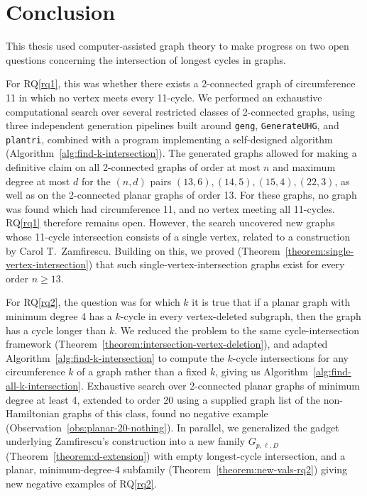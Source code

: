 \chapter{Conclusion}
\label{cha:conclusion}

This thesis used computer-assisted graph theory to make progress on two open questions concerning the intersection of longest cycles in graphs.

For RQ\ref{rq1}, this was whether there exists a 2-connected graph of circumference 11 in which no vertex meets every 11-cycle. We performed an exhaustive computational search over several restricted classes of 2-connected graphs, using three independent generation pipelines built around \texttt{geng}, \texttt{GenerateUHG}, and \texttt{plantri}, combined with a program implementing a self-designed algorithm (Algorithm~\ref{alg:find-k-intersection}). The generated graphs allowed for making a definitive claim on all 2-connected graphs of order at most $n$ and maximum degree at most $d$ for the $(n,d)$ pairs $(13,6),(14,5),(15,4),(22,3)$, as well as on the 2-connected planar graphs of order 13. For these graphs, no graph was found which had circumference 11, and no vertex meeting all 11-cycles. RQ\ref{rq1} therefore remains open. However, the search uncovered new graphs whose 11-cycle intersection consists of a single vertex, related to a construction by Carol T.\ Zamfirescu. Building on this, we proved (Theorem~\ref{theorem:single-vertex-intersection}) that such single-vertex-intersection graphs exist for every order $n \ge 13$.

For RQ\ref{rq2}, the question was for which $k$ it is true that if a planar graph with minimum degree 4 has a $k$-cycle in every vertex-deleted subgraph, then the graph has a cycle longer than $k$. We reduced the problem to the same cycle-intersection framework (Theorem~\ref{theorem:intersection-vertex-deletion}), and adapted Algorithm~\ref{alg:find-k-intersection} to compute the $k$-cycle intersections for any circumference $k$ of a graph rather than a fixed $k$, giving us Algorithm~\ref{alg:find-all-k-intersection}. Exhaustive search over 2-connected planar graphs of minimum degree at least 4, extended to order 20 using a supplied graph list of the non-Hamiltonian graphs of this class, found no negative example (Observation~\ref{obs:planar-20-nothing}). In parallel, we generalized the gadget underlying Zamfirescu's construction into a new family $G_{p,\ell,D}$ (Theorem~\ref{theorem:d-extension}) with empty longest-cycle intersection, and a planar, minimum-degree-4 subfamily (Theorem~\ref{theorem:new-vals-rq2}) giving new negative examples of RQ\ref{rq2}.

